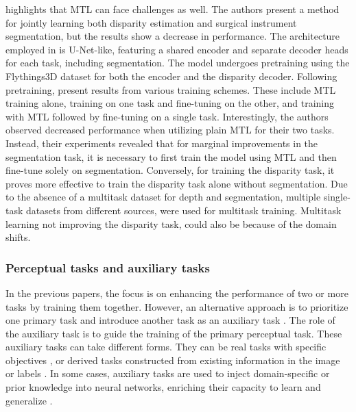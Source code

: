 \documentclass[times,twocolumn,final]{elsarticle}
\begin{document}
\citet{msdesis} highlights that MTL can face challenges as well. The authors present a method for jointly learning both disparity estimation and surgical instrument segmentation, but the results show a decrease in performance.
The architecture employed in \citet{msdesis} is U-Net-like, featuring a shared encoder and separate decoder heads for each task, including segmentation. The model undergoes pretraining using the Flythings3D dataset \citep{MIFDB16} for both the encoder and the disparity decoder.
Following pretraining, \citet{msdesis} present results from various training schemes. These include MTL training alone, training on one task and fine-tuning on the other, and training with MTL followed by fine-tuning on a single task.
Interestingly, the authors observed decreased performance when utilizing plain MTL for their two tasks. Instead, their experiments revealed that for marginal improvements in the segmentation task, it is necessary to first train the model using MTL and then fine-tune solely on segmentation. Conversely, for training the disparity task, it proves more effective to train the disparity task alone without segmentation. Due to the absence of a multitask dataset for depth and segmentation, multiple single-task datasets from different sources, were used for multitask training. Multitask learning not improving the disparity task, could also be because of the domain shifts.



\subsubsection{Perceptual tasks and auxiliary tasks}
In the previous papers, the focus is on enhancing the performance of two or more tasks by training them together.
However, an alternative approach is to prioritize one primary task and introduce another task as an auxiliary task \citep{multi_contour,multi_HOG,ss_depth_estimation_laparo,landmark_detection_submucosal}.
The role of the auxiliary task is to guide the training of the primary perceptual task.
These auxiliary tasks can take different forms. They can be real tasks with specific objectives \citep{ss_depth_estimation_laparo}, or derived tasks constructed from existing information in the image or labels \citep{landmark_detection_submucosal,multi_HOG,multi_contour}. In some cases, auxiliary tasks are used to inject domain-specific or prior knowledge into neural networks, enriching their capacity to learn and generalize \citep{landmark_detection_submucosal,ss_depth_estimation_laparo}.
\end{document}
